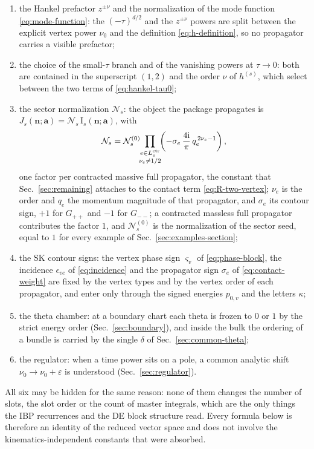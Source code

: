 \documentclass[11pt,a4paper]{article}
\newcommand{\ii}{\mathrm i}
\newcommand{\cN}{\mathcal N}
\begin{document}
\begin{enumerate}
  \item the Hankel prefactor $z^{\pm\nu}$ and the normalization of the mode function
        \eqref{eq:mode-function}: the $(-\tau)^{d/2}$ and the $z^{\pm\nu}$ powers are split between
        the explicit vertex power $\nu_0$ and the definition \eqref{eq:h-definition}, so no
        propagator carries a visible prefactor;
  \item the choice of the small-$\tau$ branch and of the vanishing powers at $\tau\to0$: both are
        contained in the superscript $(1,2)$ and the order $\nu$ of $h^{(s)}$, which select between
        the two terms of \eqref{eq:hankel-tau0};
  \item the sector normalization $\cN_s$: the object the package propagates is
        $J_s(\bm n;\bm a)=\cN_s\,\text{I}_s(\bm n;\bm a)$, with
        \begin{equation}
          \cN_s=\cN_s^{(0)}\!\!\prod_{\substack{e\in L_s^{\rm ctr}\\[1pt]\nu_e\neq 1/2}}\!\!
          \left(-\sigma_e\,\frac{4\ii}{\pi}\,q_e^{\,2\nu_e-1}\right),
          \label{eq:sector-normalization}
        \end{equation}
        one factor per contracted massive full propagator, the constant that
        Sec.~\ref{sec:remaining} attaches to the contact term \eqref{eq:R-two-vertex}; $\nu_e$ is the
        order and $q_e$ the momentum magnitude of that propagator, and $\sigma_e$ its contour sign,
        $+1$ for $G_{++}$ and $-1$ for $G_{--}$; a
        contracted massless full propagator contributes the factor $1$, and $\cN_s^{(0)}$ is the
        normalization of the sector seed, equal to $1$ for every example of
        Sec.~\ref{sec:examples-section};
  \item the SK contour signs: the vertex phase sign $\varsigma_v$ of \eqref{eq:phase-block}, the incidence
        $\epsilon_{ve}$ of \eqref{eq:incidence} and the propagator sign $\sigma_e$ of
        \eqref{eq:contact-weight} are fixed by the
        vertex types and by the vertex order of each propagator, and enter only through the signed
        energies $p_{0,v}$ and the letters $\kappa$;
  \item the theta chamber: at a boundary chart each theta is frozen to $0$ or $1$ by the strict
        energy order (Sec.~\ref{sec:boundary}), and inside the bulk the ordering of a bundle is
        carried by the single $\delta$ of Sec.~\ref{sec:common-theta};
  \item the regulator: when a time power sits on a pole, a common analytic shift
        $\nu_0\to\nu_0+\varepsilon$ is understood (Sec.~\ref{sec:regulator}).
\end{enumerate}
All six may be hidden for the same reason: none of them changes the number of slots, the slot
order or the count of master integrals, which are the only things the IBP recurrences and the DE
block structure read. Every formula below is therefore an identity of the reduced vector space and
does not involve the kinematics-independent constants that were absorbed.
\end{document}
